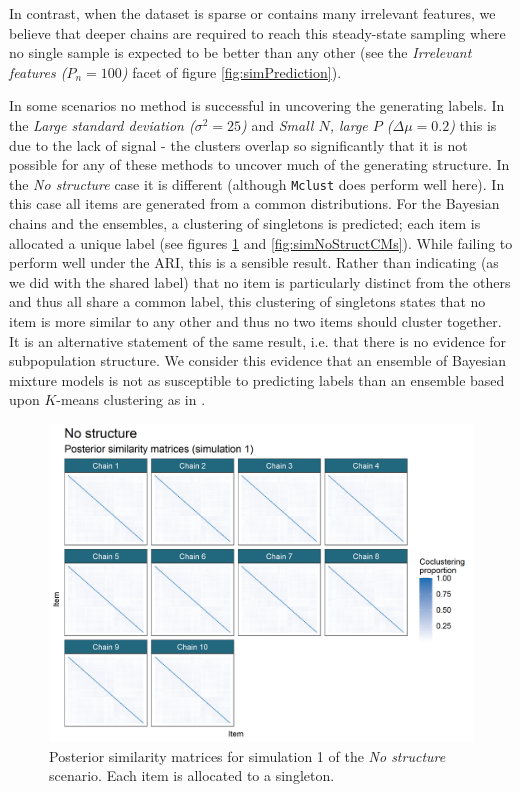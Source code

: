 \documentclass[]{article}
\begin{document}
In contrast, when the dataset is sparse or contains many irrelevant features, we believe that deeper chains are required to reach this steady-state sampling where no single sample is expected to be better than any other (see the \emph{Irrelevant features ($P_n = 100$)} facet of figure \ref{fig:simPrediction}).


In some scenarios no method is successful in uncovering the generating labels. In the \emph{Large standard deviation ($\sigma^2 =25$)} and \emph{Small $N$, large $P$ ($\Delta \mu = 0.2$)} this is due to the lack of signal - the clusters overlap so significantly that it is not possible for any of these methods to uncover much of the generating structure. In the \emph{No structure} case it is different (although \texttt{Mclust} does perform well here). In this case all items are generated from a common distributions. For the Bayesian chains and the ensembles, a clustering of singletons is predicted; each item is allocated a unique label (see figures \ref{fig:simNoStructPSMs} and \ref{fig:simNoStructCMs}). While failing to perform well under the ARI, this is a sensible result. Rather than indicating (as we did with the shared label) that no item is particularly distinct from the others and thus all share a common label, this clustering of singletons states that no item is more similar to any other and thus no two items should cluster together. It is an alternative statement of the same result, i.e. that there is no evidence for subpopulation structure. We consider this evidence that an ensemble of Bayesian mixture models is not as susceptible to predicting labels than an ensemble based upon $K$-means clustering as in \cite{senbabaoglu2014reassessment,senbabaouglu2014critical}.

\begin{figure} %
	\centering
	\includegraphics[scale=0.65]{./Images/Simulations/PSMs/no_structureSim1.png}
	\caption{Posterior similarity matrices for simulation 1 of the \emph{No structure} scenario. Each item is allocated to a singleton.}
	\label{fig:simNoStructPSMs}
\end{figure}
\end{document}
